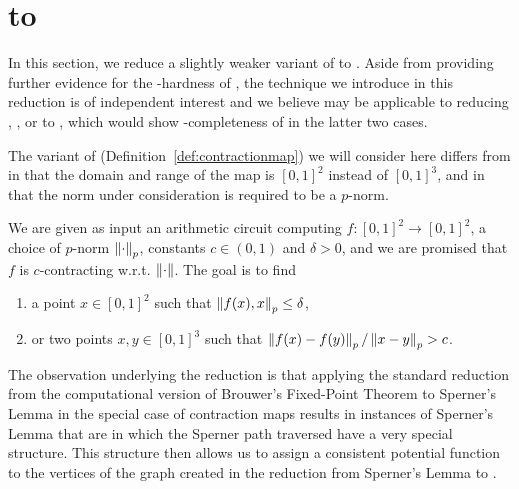 \chapter{\TwoDContractionMap to \EOPL}
In this section, we reduce a slightly weaker variant of \CM to \EOPL. Aside from providing further evidence for the \CLS-hardness of \EOPL, the technique we introduce in this reduction is of independent interest and we believe may be applicable to reducing \CM, \MMCM, or \MBanach to \EOPL, which would show \CLS-completeness of \EOPL in the latter two cases.

The variant of \CM (Definition~\ref{def:contractionmap}) we will consider here differs from \CM in that the domain and range of the map is $[0,1]^2$ instead of $[0,1]^3$, and in that the norm under consideration is required to be a $p$-norm.
\begin{definition}[\TwoDContractionMap] 
  \label{def:2DContractionMap}
We are given as input an arithmetic circuit computing $f: [0,1]^2\to [0,1]^2$,
a choice of $p$-norm $\left\| \cdot \right\|_p$, constants \mbox{$c \in (0,1)$}
and $\delta > 0$, and we are promised that $f$ is $c$-contracting w.r.t. $\left\| \cdot \right\|$.
The goal is to find
\begin{enumerate}[label=(E\arabic*)]
\item a point $x\in [0,1]^2$ such that $\left\| f(x),x \right\|_p \leq \delta$, 
\item or two points $x,y\in [0,1]^3$ such that $\left\| f(x) - f(y) \right\|_p/\left\| x-y \right\|_p > c$. 
\end{enumerate}
\end{definition}

The observation underlying the reduction is that applying the standard reduction from the computational version of Brouwer's Fixed-Point Theorem to Sperner's Lemma in the special case of contraction maps results in instances of Sperner's Lemma that are in which the Sperner path traversed have a very special structure. This structure then allows us to assign a consistent potential function to the vertices of the \PPAD graph created in the reduction from Sperner's Lemma to \EOL.

